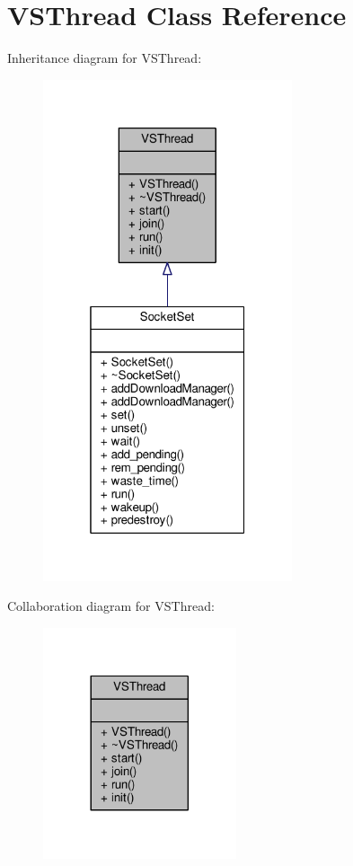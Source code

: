 \hypertarget{classVSThread}{}\section{V\+S\+Thread Class Reference}
\label{classVSThread}


Inheritance diagram for V\+S\+Thread\+:
\nopagebreak
\begin{figure}[H]
\begin{center}
\leavevmode
\includegraphics[width=208pt]{dd/d0e/classVSThread__inherit__graph}
\end{center}
\end{figure}


Collaboration diagram for V\+S\+Thread\+:
\nopagebreak
\begin{figure}[H]
\begin{center}
\leavevmode
\includegraphics[width=161pt]{d4/d66/classVSThread__coll__graph}
\end{center}
\end{figure}
